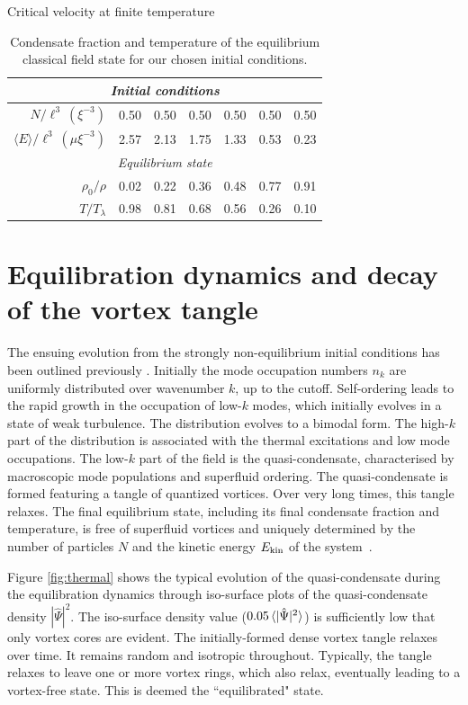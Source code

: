 \begin{chapter}{\label{cha:nonequib}Critical velocity at finite temperature}
\begin{table}
\centering
\begin{tabular}{rcccccc}
\multicolumn{7}{c}{\it Initial conditions} \\
\hline
\rule{0pt}{3ex}$N/\ell^3~(\xi^{-3})$           & 0.50 & 0.50 & 0.50 & 0.50 & 0.50 & 0.50 \\
$\langle E \rangle/\ell^3~(\mu \xi^{-3})$  & 2.57 & 2.13 & 1.75 & 1.33 & 0.53 & 0.23 \\
\multicolumn{7}{c}{\it Equilibrium state} \\
\hline
\rule{0pt}{3ex}$\rho_0/\rho$        & 0.02 & 0.22 & 0.36 & 0.48 & 0.77 & 0.91 \\
$T/T_\lambda$        & 0.98 & 0.81 & 0.68 & 0.56 & 0.26 & 0.10
\end{tabular}
\caption{Condensate fraction and temperature of the equilibrium classical field state for our chosen initial conditions.}
\label{tbl:cond_frac}
\end{table}

\section{Equilibration dynamics and decay of the vortex tangle}
\label{sec:tangle}

The ensuing evolution from the strongly non-equilibrium initial conditions has been outlined previously \cite{PhysRevA.66.013603,pattinson_2014}.  Initially the mode occupation numbers $n_k$ are uniformly distributed over wavenumber $k$, up to the cutoff.  Self-ordering leads to the rapid growth in the occupation of low-$k$ modes, which initially evolves in a state of weak turbulence.  The distribution evolves to a bimodal form. The high-$k$ part of the distribution is associated with the thermal excitations and low mode occupations. The low-$k$ part of the field is the quasi-condensate, characterised by macroscopic mode populations and superfluid ordering.  The quasi-condensate is formed featuring a tangle of quantized vortices.  Over very long times, this tangle relaxes.  The final equilibrium state, including its final condensate fraction and temperature, is free of superfluid vortices and uniquely determined by the number of particles $N$ and the kinetic energy $E_{\rm kin}$ of the system~\cite{PhysRevLett.95.263901}.  

Figure \ref{fig:thermal} shows the typical evolution of the quasi-condensate during the equilibration dynamics through iso-surface plots of the quasi-condensate density $|\hat{\Psi}|^2$.  The iso-surface density value ($0.05\braket{|\hat{\Psi}|^2}$) is sufficiently low that only vortex cores are evident.   The initially-formed dense vortex tangle relaxes over time.  It remains random and isotropic throughout.  Typically, the tangle relaxes to leave one or more vortex rings, which also relax, eventually leading to a vortex-free state.   This is deemed the ``equilibrated" state.    


\end{chapter}
